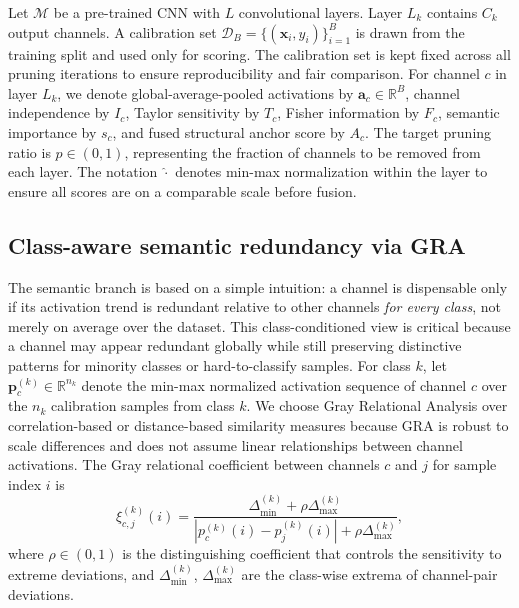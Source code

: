 \documentclass[preprint,12pt]{elsarticle}
\begin{document}
Let $\mathcal{M}$ be a pre-trained CNN with $L$ convolutional layers. Layer $L_k$ contains $C_k$ output channels. A calibration set $\mathcal{D}_B=\{(\mathbf{x}_i,y_i)\}_{i=1}^{B}$ is drawn from the training split and used only for scoring. The calibration set is kept fixed across all pruning iterations to ensure reproducibility and fair comparison. For channel $c$ in layer $L_k$, we denote global-average-pooled activations by $\mathbf{a}_c\in\mathbb{R}^{B}$, channel independence by $I_c$, Taylor sensitivity by $T_c$, Fisher information by $F_c$, semantic importance by $s_c$, and fused structural anchor score by $A_c$. The target pruning ratio is $p\in(0,1)$, representing the fraction of channels to be removed from each layer. The notation $\hat{\cdot}$ denotes min-max normalization within the layer to ensure all scores are on a comparable scale before fusion.

\subsection{Class-aware semantic redundancy via GRA}

The semantic branch is based on a simple intuition: a channel is dispensable only if its activation trend is redundant relative to other channels \emph{for every class}, not merely on average over the dataset. This class-conditioned view is critical because a channel may appear redundant globally while still preserving distinctive patterns for minority classes or hard-to-classify samples. For class $k$, let $\mathbf{p}_c^{(k)}\in\mathbb{R}^{n_k}$ denote the min-max normalized activation sequence of channel $c$ over the $n_k$ calibration samples from class $k$. We choose Gray Relational Analysis over correlation-based or distance-based similarity measures because GRA is robust to scale differences and does not assume linear relationships between channel activations. The Gray relational coefficient between channels $c$ and $j$ for sample index $i$ is
\begin{equation}
\xi_{c,j}^{(k)}(i)=
\frac{\Delta_{\min}^{(k)}+\rho\Delta_{\max}^{(k)}}
{\left|p_c^{(k)}(i)-p_j^{(k)}(i)\right|+\rho\Delta_{\max}^{(k)}},
\label{eq:ivc_gra_coeff}
\end{equation}
where $\rho\in(0,1)$ is the distinguishing coefficient that controls the sensitivity to extreme deviations, and $\Delta_{\min}^{(k)}$, $\Delta_{\max}^{(k)}$ are the class-wise extrema of channel-pair deviations.
\end{document}
